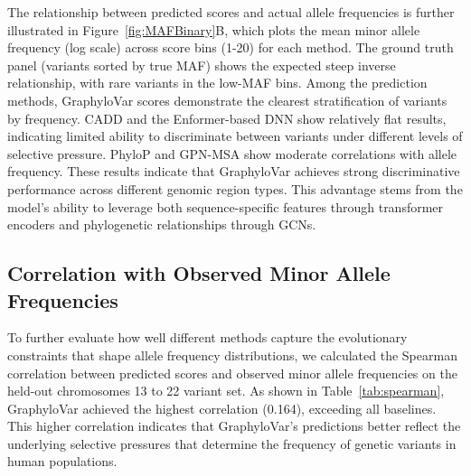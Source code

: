 \documentclass[unnumsec,webpdf,contemporary,large]{oup-authoring-template}%
\theoremstyle{thmstyleone}%
\theoremstyle{thmstyletwo}%
\theoremstyle{thmstylethree}%
\begin{document}
The relationship between predicted scores and actual allele frequencies is further illustrated in Figure~\ref{fig:MAFBinary}B, which plots the mean minor allele frequency (log scale) across score bins (1-20) for each method. The ground truth panel (variants sorted by true MAF) shows the expected steep inverse relationship, with rare variants in the low-MAF bins. Among the prediction methods, GraphyloVar scores demonstrate the clearest stratification of variants by frequency. CADD and the Enformer-based DNN show relatively flat results, indicating limited ability to discriminate between variants under different levels of selective pressure. PhyloP and GPN-MSA show moderate correlations with allele frequency.
These results indicate that GraphyloVar achieves strong discriminative performance across different genomic region types. This advantage stems from the model's ability to leverage both sequence-specific features through transformer encoders and phylogenetic relationships through GCNs.




\subsection{Correlation with Observed Minor Allele Frequencies}

To further evaluate how well different methods capture the evolutionary constraints that shape allele frequency distributions, we calculated the Spearman correlation between predicted scores and observed minor allele frequencies on the held-out chromosomes 13 to 22 variant set. As shown in Table~\ref{tab:spearman}, GraphyloVar achieved the highest correlation (0.164), exceeding all baselines. This higher correlation indicates that GraphyloVar's predictions better reflect the underlying selective pressures that determine the frequency of genetic variants in human populations.
\end{document}
